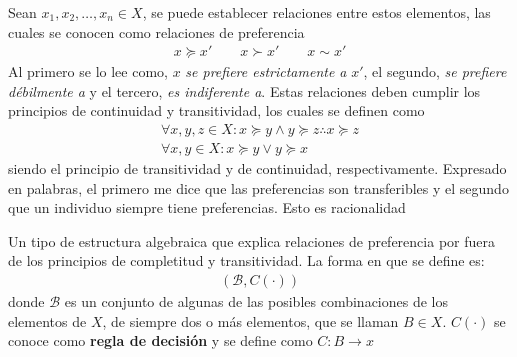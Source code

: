 



 {Sean $x_1,x_2, \dots, x_{n} \in X$, se puede establecer
    relaciones entre estos elementos, las cuales se conocen como relaciones de
    preferencia
    \begin{align}
        x \succeq x' \qquad  x\succ x' \qquad x \sim x' 
    \end{align}
    Al primero se lo lee como, $x$ \textit{se prefiere estrictamente a} $x'$, el
    segundo, \textit{se prefiere débilmente a} y el tercero, \textit{es
    indiferente a}. Estas relaciones deben cumplir los principios de continuidad
    y transitividad, los cuales se definen como
    \begin{gather}
        \forall x,y,z \in X : x \succeq y \wedge y \succeq z \therefore x \succeq z \\
        \forall x,y \in X : x \succeq y \vee y \succeq x
    \end{gather}
    siendo el principio de transitividad y de continuidad, respectivamente.
    Expresado en palabras, el primero me dice que las preferencias son
    transferibles y el segundo que un individuo siempre tiene preferencias. Esto
    es racionalidad
}

 {Un tipo de estructura algebraica que explica
relaciones de preferencia por fuera de los principios de completitud y transitividad. 
La forma en que se define es:
    \begin{align}
        (\mathcal{B} , C(\cdot))
    \end{align}
donde $\mathcal{B}$ es un conjunto de algunas de las posibles combinaciones de
los elementos de $X$, de siempre dos o más elementos, que se llaman $B \in X$.
$C(\cdot)$ se conoce como \textbf{regla de decisión} y se define como $C: B \rightarrow x$
}



